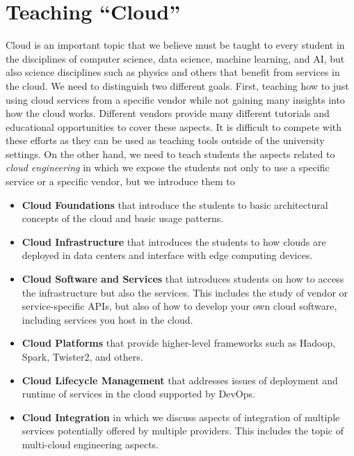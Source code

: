 \documentclass[conference]{IEEEtran}
\begin{document}
\section{Teaching ``Cloud''}

Cloud is an important topic that we believe must be taught to every student in the disciplines of computer science, data science, machine learning, and AI, but also science disciplines such as physics and others that benefit from services in the cloud. We need to distinguish two different goals. First, teaching how to just using cloud services from a specific vendor while not gaining many insights into how the cloud works. Different vendors provide many different tutorials and educational opportunities to cover these aspects. It is difficult to compete with these efforts as they can be used as teaching tools outside of the university settings. On the other hand, we need to teach students the aspects related to {\em cloud engineering} in which we expose the students not only to use a specific service or a specific vendor, but we introduce them to

\begin{itemize}

\item{\bf Cloud Foundations} that introduce the students to basic
  architectural concepts of the cloud and basic usage patterns.
    
\item{\bf Cloud Infrastructure} that introduces the students to how
  clouds are deployed in data centers and interface with edge
  computing devices.

\item{\bf Cloud Software and Services} that introduces students on how to
  access the infrastructure but also the services. This includes the
  study of vendor or service-specific APIs, but also of how to develop
  your own cloud software, including services you host in the cloud.

\item{\bf Cloud Platforms} that provide higher-level frameworks such
  as Hadoop, Spark, Twister2, and others.

\item{\bf Cloud Lifecycle Management} that addresses issues of
  deployment and runtime of services in the cloud supported by DevOps.

\item{\bf Cloud Integration} in which we discuss aspects of integration of multiple services potentially offered by multiple providers. This includes the topic of multi-cloud engineering
  aspects.
  
\end{itemize}
\end{document}
